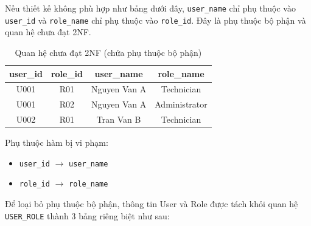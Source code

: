 Nếu thiết kế không phù hợp như bảng dưới đây, \texttt{user\_name} chỉ phụ thuộc vào \texttt{user\_id} và \texttt{role\_name} chỉ phụ thuộc vào \texttt{role\_id}. Đây là phụ thuộc bộ phận và quan hệ chưa đạt 2NF.

\begin{table}[H]
\centering
\caption{Quan hệ chưa đạt 2NF (chứa phụ thuộc bộ phận)}
\begin{tabular}{|c|c|c|c|}
\hline
\textbf{user\_id} & \textbf{role\_id} & \textbf{user\_name} & \textbf{role\_name} \\ \hline
U001 & R01 & Nguyen Van A & Technician \\ \hline
U001 & R02 & Nguyen Van A & Administrator \\ \hline
U002 & R01 & Tran Van B & Technician \\ \hline
\end{tabular}
\end{table}

Phụ thuộc hàm bị vi phạm:
\begin{itemize}
    \item \texttt{user\_id} $\rightarrow$ \texttt{user\_name}
    \item \texttt{role\_id} $\rightarrow$ \texttt{role\_name}
\end{itemize}

Để loại bỏ phụ thuộc bộ phận, thông tin User và Role được tách khỏi quan hệ \texttt{USER\_ROLE} thành 3 bảng riêng biệt như sau:

